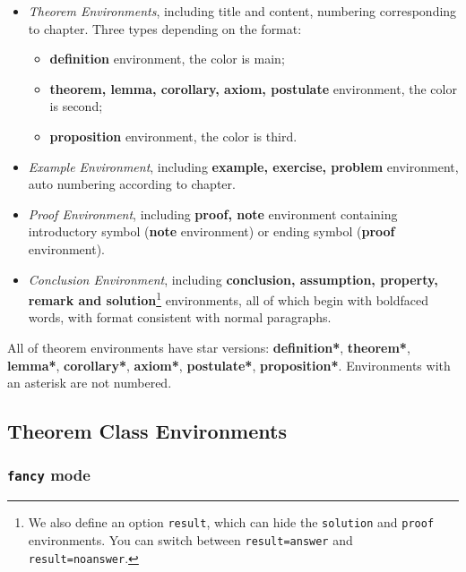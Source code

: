 \documentclass[11pt]{elegantbook}
\begin{document}
\begin{itemize}
\item \textit{Theorem Environments}, including title and content, numbering corresponding to chapter. Three types depending on the format:
   \begin{itemize}
      \item \textcolor{main}{\textbf{definition}} environment, the color is  \textcolor{main}{main};
      \item \textcolor{second}{\textbf{theorem, lemma, corollary, axiom, postulate}} environment, the color is \textcolor{second} {second};
      \item \textcolor{third}{\textbf{proposition}} environment, the color is \textcolor{third}{third}.
   \end{itemize}
\item \textit{Example Environment}, including \textbf{example, exercise, problem} environment, auto numbering according to chapter.
\item \textit{Proof Environment}, including \textbf{proof, note} environment containing introductory symbol (\textbf{note} environment) or ending symbol (\textbf{proof} environment).
\item \textit{Conclusion Environment}, including \textbf{conclusion, assumption, property, remark and solution}\footnote{We also define an option \lstinline{result}, which can hide the \lstinline{solution} and \lstinline{proof} environments. You can switch between \lstinline{result=answer} and \lstinline{result=noanswer}.} environments, all of which begin with boldfaced words, with format consistent with normal paragraphs.
\end{itemize}

All of theorem environments have star versions: \textcolor{main}{\textbf{definition*}}, \textcolor{second}{\textbf{theorem*}}, \textcolor{second}{\textbf{lemma*}}, \textcolor{second}{\textbf{corollary*}}, \textcolor{second}{\textbf{axiom*}}, \textcolor{second}{\textbf{postulate*}}, \textcolor{third}{\textbf{proposition*}}. Environments with an asterisk are not numbered.

\subsection{Theorem Class Environments}

\subsubsection{\lstinline{fancy} mode}
\end{document}

